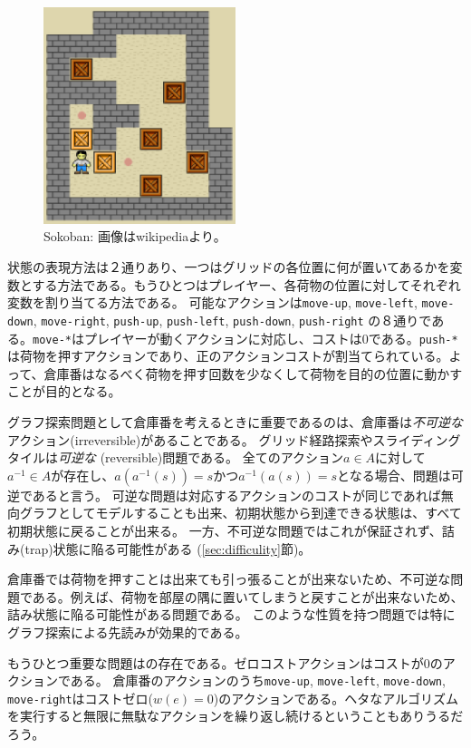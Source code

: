 \begin{figure}
\centering
\includegraphics[bb=0 0 213 238,width=0.5\textwidth]{figures/sokoban.eps}
\caption{Sokoban: 画像はwikipediaより。}
\label{fig:sokoban}
\end{figure}

状態の表現方法は２通りあり、一つはグリッドの各位置に何が置いてあるかを変数とする方法である。もうひとつはプレイヤー、各荷物の位置に対してそれぞれ変数を割り当てる方法である。
可能なアクションは{\tt move-up}, {\tt move-left}, {\tt move-down}, {\tt move-right}, {\tt push-up}, {\tt push-left}, {\tt push-down}, {\tt push-right} の８通りである。{\tt move-*}はプレイヤーが動くアクションに対応し、コストは0である。{\tt push-*}は荷物を押すアクションであり、正のアクションコストが割当てられている。よって、倉庫番はなるべく荷物を押す回数を少なくして荷物を目的の位置に動かすことが目的となる。

グラフ探索問題として倉庫番を考えるときに重要であるのは、倉庫番は{\it 不可逆な}アクション(irreversible)があることである。
グリッド経路探索やスライディングタイルは{\it 可逆な} (reversible)問題である。
全てのアクション$a \in A$に対して$a^{-1} \in A$が存在し、$a(a^{-1}(s)) = s$かつ$a^{-1}(a(s)) = s$となる場合、問題は可逆であると言う。
可逆な問題は対応するアクションのコストが同じであれば無向グラフとしてモデルすることも出来、初期状態から到達できる状態は、すべて初期状態に戻ることが出来る。
一方、不可逆な問題ではこれが保証されず、詰み(trap)状態に陥る可能性がある (\ref{sec:difficulity}節)。

倉庫番では荷物を押すことは出来ても引っ張ることが出来ないため、不可逆な問題である。例えば、荷物を部屋の隅に置いてしまうと戻すことが出来ないため、詰み状態に陥る可能性がある問題である。
このような性質を持つ問題では特にグラフ探索による先読みが効果的である。

もうひとつ重要な問題はの存在である。ゼロコストアクションはコストが0のアクションである。%
倉庫番のアクションのうち{\tt move-up}, {\tt move-left}, {\tt move-down}, {\tt move-right}はコストゼロ($w(e)=0$)のアクションである。ヘタなアルゴリズムを実行すると無限に無駄なアクションを繰り返し続けるということもありうるだろう。


